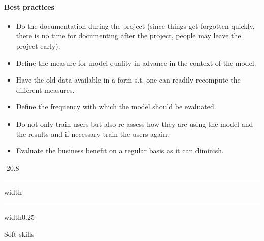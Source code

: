 \documentclass[a4paper, landscape, 6pt, fleqn]{scrartcl}
\makeatletter
\renewcommand{\section}{\@startsection{section}{1}{0mm}%
{-2\baselineskip}{0.8\baselineskip}%
{\hrule depth 0.2pt width\columnwidth\hrule depth1.5pt
width0.25\columnwidth\vspace*{1.2em}\Large\bfseries}}
\makeatother
\begin{document}
\begin{multicols*}{4}
\paragraph{Best practices}

\begin{itemize}
\item Do the documentation during the project (since things get forgotten quickly, there is no time for documenting after the project, people may leave the project early).
\item Define the measure for model quality in advance in the context of the model.
\item Have the old data available in a form s.t. one can readily recompute the different measures.
\item Define the frequency with which the model should be evaluated.
\item Do not only train users but also re-assess how they are using the model and the results and if necessary train the users again.
\item Evaluate the business benefit on a regular basis as it can diminish.
\end{itemize}

\section{Soft skills}


\end{multicols*}
\end{document}
